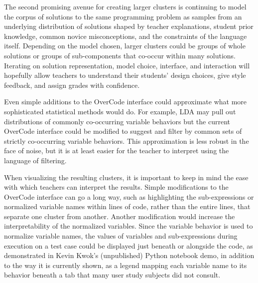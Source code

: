 The second promising avenue for creating larger clusters is continuing to model the corpus of solutions to the same programming problem as samples from an underlying distribution of solutions shaped by teacher explanations, student prior knowledge, common novice misconceptions, and the constraints of the language itself. Depending on the model chosen, larger clusters could be groups of whole solutions or groups of sub-components that co-occur within many solutions. Iterating on solution representation, model choice, interface, and interaction will hopefully allow teachers to understand their students' design choices, give style feedback, and assign grades with confidence. 

Even simple additions to the OverCode interface could approximate what more sophisticated statistical methods would do. For example, LDA may pull out distributions of commonly co-occurring variable behaviors but the current OverCode interface could be modified to suggest and filter by common sets of strictly co-occurring variable behaviors. This approximation is less robust in the face of noise, but it is at least easier for the teacher to interpret using the language of filtering. %

When visualizing the resulting clusters, it is important to keep in mind the ease with which teachers can interpret the results. Simple modifications to the OverCode interface can go a long way, such as highlighting the sub-expressions or normalized variable names within lines of code, rather than the entire lines, that separate one cluster from another. Another modification would increase the interpretability of the normalized variables. Since the variable behavior is used to normalize variable names, the values of variables and sub-expressions during execution on a test case could be displayed just beneath or alongside the code, as demonstrated in Kevin Kwok's (unpublished) Python notebook demo, in addition to the way it is currently shown, as a legend mapping each variable name to its behavior beneath a tab that many user study subjects did not consult. 



